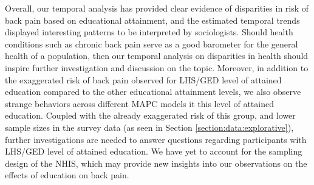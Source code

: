 \vspace{-0.2cm}
Overall, our temporal analysis has provided clear evidence of disparities in risk of back pain based on educational attainment, and the estimated temporal trends displayed interesting patterns to be interpreted by sociologists. Should health conditions such as chronic back pain serve as a good barometer for the general health of a population, then our temporal analysis on disparities in health should inspire further investigation and discussion on the topic. Moreover, in addition to the exaggerated risk of back pain observed for LHS/GED level of attained education compared to the other educational attainment levels, we also observe strange behaviors across different MAPC models it this level of attained education. Coupled with the already exaggerated risk of this group, and lower sample sizes in the survey data (as seen in Section \ref{section:data:explorative}), further investigations are needed to answer questions regarding participants with LHS/GED level of attained education. We have yet to account for the sampling design of the NHIS, which may provide new insights into our observations on the effects of education on back pain.

